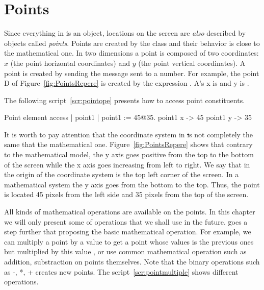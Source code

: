 \section{Points}
Since everything in \st is an object, locations on the screen are {\em also} described by objects called \emph{points}. Points are created by the class  and their behavior is close to the mathematical one.  In two dimensions a point is composed of two coordinates: $x$ (the point horizontal coordinates) and $y$ (the point vertical coordinates).
A point is created by sending the message  sent to a number. For example, the point D of Figure~\ref{fig:PointsRepere} is created by the expression . A's x is  and y is .  


The following script~\ref{scr:pointope} presents how to access point constituents. 

\begin{scriptwithtitle}{Point element access}\label{scr:pointope}
| point1 |
point1 := 45@35.
point1 x
-> 45
point1 y 
-> 35
\end{scriptwithtitle}

It is worth to pay attention that the coordinate system in \st is not completely the same that the mathematical one. Figure~\ref{fig:PointsRepere} shows that contrary to the mathematical model, the y axis goes positive from the top to the bottom of the screen while the x axis goes increasing from left to right. We say that in \sq the origin of the coordinate system is the top left corner of the screen. In a mathematical system the y axis goes from the bottom to the top. Thus, the point  is located 45 pixels from the left side  and 35 pixels from the top of the screen. 


All kinds of mathematical operations are available on the points. In this chapter we will only present some of operations that we shall use in the future.  \st goes a step further that proposing the basic mathematical operation. For example, we can multiply a point by a value to get a point whose values is the previous ones but multiplied by this value , or use common mathematical operation such as addition, substraction on points themselves. Note that the binary operations such as -, *, + creates new points.  The script~\ref{scr:pointmultiple} shows different operations.



